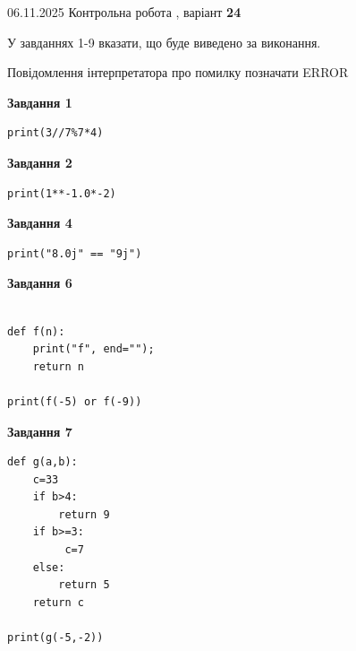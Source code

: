 \documentclass[12pt, ukrainian]{article}
\begin{document}
{\Large{06.11.2025 Контрольна робота , варіант  \No \textbf { 24 }\par}}
{
\begin {large}
У завданнях 1-9 вказати, що буде виведено за виконання.

Повідомлення інтерпретатора про помилку позначати ERROR

\begin{minipage}[t]{7.5cm}

\begin{center}
\textbf{Завдання 1}
\end{center}

\begin{verbatim}
print(3//7%7*4)
\end{verbatim}



\begin{center}
\textbf{Завдання 2}
\end{center}

\begin{verbatim}
print(1**-1.0*-2)
\end{verbatim}



\begin{center}
\textbf{Завдання 4}
\end{center}

\begin{verbatim}
print("8.0j" == "9j")
\end{verbatim}



\begin{center}
\textbf{Завдання 6}
\end{center}

\begin{verbatim}

def f(n):
    print("f", end="");
    return n

print(f(-5) or f(-9))
\end{verbatim}



\begin{center}
\textbf{Завдання 7}
\end{center}

\begin{verbatim}
def g(a,b):
    c=33
    if b>4:
        return 9
    if b>=3:
         c=7
    else: 
        return 5
    return c

print(g(-5,-2))
\end{verbatim}


\end{minipage}
\end{large}}
\end{document}
